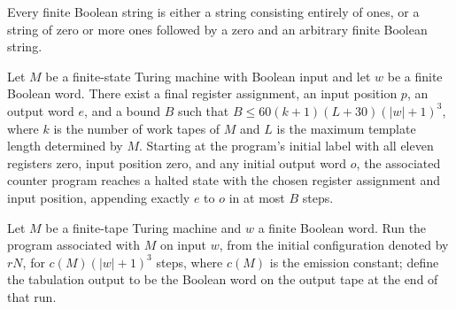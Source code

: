\begin{theorem}
\label{Complexity.UTab.classify}
\leanok
{}
Every finite Boolean string is either a string consisting entirely of ones, or a string
of zero or more ones followed by a zero and an arbitrary finite Boolean string.
\end{theorem}

\begin{theorem}
\label{Complexity.UTab.goes_any}
\leanok
{}
Let $M$ be a finite-state Turing machine with Boolean input and let $w$ be a finite
Boolean word. There exist a final register assignment, an input position $p$, an output
word $e$, and a bound $B$ such that $B\le 60(k+1)(L+30)(|w|+1)^3$, where $k$ is the
number of work tapes of $M$ and $L$ is the maximum template length determined by $M$.
Starting at the program's initial label with all eleven registers zero, input position
zero, and any initial output word $o$, the associated counter program reaches a halted
state with the chosen register assignment and input position, appending exactly $e$ to
$o$ in at most $B$ steps.
\end{theorem}

\begin{definition}
\label{Complexity.UTab.tabEmit}
\leanok
{}
Let $M$ be a finite-tape Turing machine and $w$ a finite Boolean word. Run the program
associated with $M$ on input $w$, from the initial configuration denoted by $rN$, for
$c(M)(|w|+1)^3$ steps, where $c(M)$ is the emission constant; define the tabulation
output to be the Boolean word on the output tape at the end of that run.
\end{definition}

